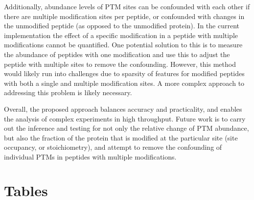 \documentclass[mcp]{article}
\numberwithin{table}{section}
\begin{document}
Additionally, abundance levels of PTM sites can be confounded with each other if there are multiple modification sites per peptide, or confounded with changes in the unmodified peptide (as opposed to the unmodified protein). In the current implementation the effect of a specific modification in a peptide with multiple modifications cannot be quantified. One potential solution to this is to measure the abundance of peptides with one modification and use this to adjust the peptide with multiple sites to remove the confounding. However, this method would likely run into challenges due to sparsity of features for modified peptides with both a single and multiple modification sites. A more complex approach to addressing this problem is likely necessary.

Overall, the proposed approach balances accuracy and practicality, and enables the analysis of complex experiments in high throughput. Future work is to carry out the inference and testing for not only the relative change of PTM abundance, but also the fraction of the protein that is modified at the particular site (site occupancy, or stoichiometry), and attempt to remove the confounding of individual PTMs in peptides with multiple modifications.

\newpage
\printbibliography


\newpage
\section{Tables}
\end{document}
